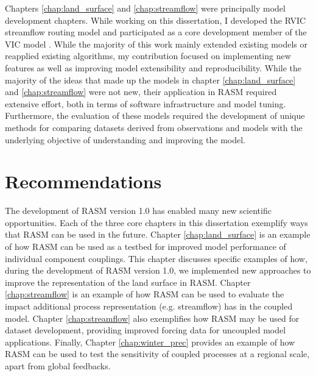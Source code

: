Chapters \ref{chap:land_surface} and \ref{chap:streamflow} were principally model development chapters.
While working on this dissertation, I developed the RVIC streamflow routing model \citep[see also \ref{sec:rvic_dev} ;][]{Hamman_2015,Hamman_2016b} and participated as a core development member of the VIC model \citep[see also \label{sec:vic_dev}]{Hamman_2016c,Hamman_2016d}.
While the majority of this work mainly extended existing models or reapplied existing algorithms, my contribution focused on implementing new features as well as improving model extensibility and reproducibility.
While the majority of the ideas that made up the models in chapter \ref{chap:land_surface} and \ref{chap:streamflow} were not new, their application in RASM required extensive effort, both in terms of software infrastructure and model tuning.
Furthermore, the evaluation of these models required the development of unique methods for comparing datasets derived from observations and models with the underlying objective of understanding and improving the model.

\section{Recommendations}
The development of RASM version 1.0 has enabled many new scientific opportunities.
Each of the three core chapters in this dissertation exemplify ways that RASM can be used in the future.
Chapter \ref{chap:land_surface} is an example of how RASM can be used as a testbed for improved model performance of individual component couplings.
This chapter discusses specific examples of how, during the development of RASM version 1.0, we implemented new approaches to improve the representation of the land surface in RASM.
Chapter \ref{chap:streamflow} is an example of how RASM can be used to evaluate the impact additional process representation (e.g. streamflow) has in the coupled model.
Chapter \ref{chap:streamflow} also exemplifies how RASM may be used for dataset development, providing improved forcing data for uncoupled model applications.
Finally, Chapter \ref{chap:winter_prec} provides an example of how RASM can be used to test the sensitivity of coupled processes at a regional scale, apart from global feedbacks.

